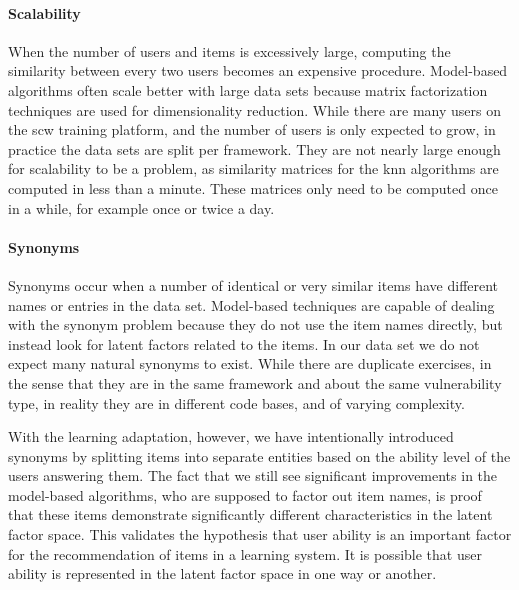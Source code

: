 \paragraph{Scalability}
When the number of users and items is excessively large, computing the similarity between every two users becomes an expensive procedure.
Model-based algorithms often scale better with large data sets because matrix factorization techniques are used for dimensionality reduction.
While there are many users on the \gls{scw} training platform, and the number of users is only expected to grow, in practice the data sets are split per framework.
They are not nearly large enough for scalability to be a problem, as similarity matrices for the \gls{knn} algorithms are computed in less than a minute.
These matrices only need to be computed once in a while, for example once or twice a day.

\paragraph{Synonyms}
Synonyms occur when a number of identical or very similar items have different names or entries in the data set.
Model-based techniques are capable of dealing with the synonym problem because they do not use the item names directly, but instead look for latent factors related to the items.
In our data set we do not expect many natural synonyms to exist.
While there are duplicate exercises, in the sense that they are in the same framework and about the same vulnerability type, in reality they are in different code bases, and of varying complexity.

With the learning adaptation, however, we have intentionally introduced synonyms by splitting items into separate entities based on the ability level of the users answering them.
The fact that we still see significant improvements in the model-based algorithms, who are supposed to factor out item names, is proof that these items demonstrate significantly different characteristics in the latent factor space.
This validates the hypothesis that user ability is an important factor for the recommendation of items in a learning system.
It is possible that user ability is represented in the latent factor space in one way or another.

